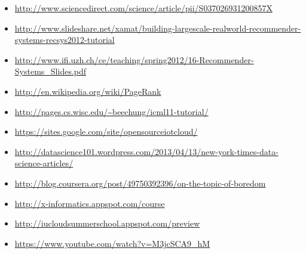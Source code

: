 \begin{itemize}
\item
  \url{http://www.sciencedirect.com/science/article/pii/S037026931200857X}
\item
  \url{http://www.slideshare.net/xamat/building-largescale-realworld-recommender-systems-recsys2012-tutorial}
\item
  \url{http://www.ifi.uzh.ch/ce/teaching/spring2012/16-Recommender-Systems_Slides.pdf}
\item
  \url{http://en.wikipedia.org/wiki/PageRank}
\item
  \url{http://pages.cs.wisc.edu/~beechung/icml11-tutorial/}
\item
  \url{https://sites.google.com/site/opensourceiotcloud/}
\item
  \url{http://datascience101.wordpress.com/2013/04/13/new-york-times-data-science-articles/}
\item
  \url{http://blog.coursera.org/post/49750392396/on-the-topic-of-boredom}
\item
  \url{http://x-informatics.appspot.com/course}
\item
  \url{http://iucloudsummerschool.appspot.com/preview}
\item
  \url{https://www.youtube.com/watch?v=M3jcSCA9_hM}
\end{itemize}


